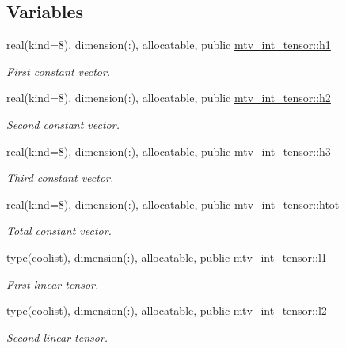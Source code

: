 \subsection*{Variables}
\begin{DoxyCompactItemize}
\item 
real(kind=8), dimension(\+:), allocatable, public \hyperlink{namespacemtv__int__tensor_a8979293cdfe7d9e67f3348a444076f3c}{mtv\+\_\+int\+\_\+tensor\+::h1}
\begin{DoxyCompactList}\small\item\em First constant vector. \end{DoxyCompactList}\item 
real(kind=8), dimension(\+:), allocatable, public \hyperlink{namespacemtv__int__tensor_ad0dd8bb28d5e88e5776c48b302ae4b29}{mtv\+\_\+int\+\_\+tensor\+::h2}
\begin{DoxyCompactList}\small\item\em Second constant vector. \end{DoxyCompactList}\item 
real(kind=8), dimension(\+:), allocatable, public \hyperlink{namespacemtv__int__tensor_a596c16bed479b011818d66810e590bae}{mtv\+\_\+int\+\_\+tensor\+::h3}
\begin{DoxyCompactList}\small\item\em Third constant vector. \end{DoxyCompactList}\item 
real(kind=8), dimension(\+:), allocatable, public \hyperlink{namespacemtv__int__tensor_aa82b34ace4bb21fbfc0e37ccc3db4815}{mtv\+\_\+int\+\_\+tensor\+::htot}
\begin{DoxyCompactList}\small\item\em Total constant vector. \end{DoxyCompactList}\item 
type(coolist), dimension(\+:), allocatable, public \hyperlink{namespacemtv__int__tensor_a2dbd181e62dbbb9aedcbd6535ca56ec5}{mtv\+\_\+int\+\_\+tensor\+::l1}
\begin{DoxyCompactList}\small\item\em First linear tensor. \end{DoxyCompactList}\item 
type(coolist), dimension(\+:), allocatable, public \hyperlink{namespacemtv__int__tensor_aa6dcec8a4783e982cd8894a15ae210d4}{mtv\+\_\+int\+\_\+tensor\+::l2}
\begin{DoxyCompactList}\small\item\em Second linear tensor. \end{DoxyCompactList}\item 

\end{DoxyCompactItemize}
